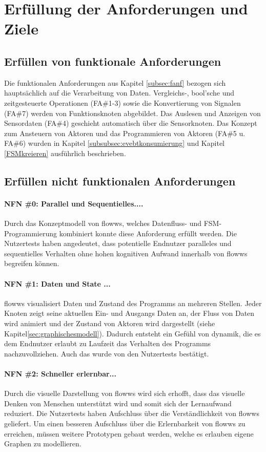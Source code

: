 \section{Erfüllung der Anforderungen und Ziele}
\subsection{Erfüllen von funktionale Anforderungen}
Die funktionalen Anforderungen aus Kapitel \ref{subsec:fanf} bezogen sich hauptsächlich auf die Verarbeitung von Daten. Vergleichs-, bool'sche und zeitgesteuerte Operationen (FA\#1-3) sowie die Konvertierung von Signalen (FA\#7) werden von Funktionsknoten abgebildet. Das Auslesen und Anzeigen von Sensordaten (FA\#4) geschieht automatisch über die Sensorknoten. Das Konzept zum Ansteuern von Aktoren und das Programmieren von Aktoren (FA\#5 u. FA\#6) wurden in Kapitel \ref{subsubsec:evebtkonsumierung} und Kapitel \ref{FSMkreieren} ausführlich beschrieben.

\subsection{Erfüllen nicht funktionalen Anforderungen}
\paragraph{NFN \#0: Parallel und Sequentielles....} Durch das Konzeptmodell von flowws, welches Datenfluss- und \ac{FSM}-Programmierung kombiniert konnte diese Anforderung erfüllt werden. Die Nutzertests haben angedeutet, dass potentielle Endnutzer paralleles und sequentielles Verhalten ohne hohen kognitiven Aufwand innerhalb von flowws begreifen können.

\paragraph{NFN \#1: Daten und State ...} flowws visualisiert Daten und Zustand des Programms an mehreren Stellen. Jeder Knoten zeigt seine aktuellen Ein- und Ausgangs Daten an, der Fluss von Daten wird animiert und der Zustand von Aktoren wird dargestellt (siehe Kapitel\ref{sec:graphischesmodell}). Dadurch entsteht ein Gefühl von dynamik, die es dem Endnutzer erlaubt zu Laufzeit das Verhalten des Programms nachzuvollziehen. Auch das wurde von den Nutzertests bestätigt.

\paragraph{NFN \#2: Schneller erlernbar...} Durch die visuelle Darstellung von flowws wird sich erhofft, dass das visuelle Denken von Menschen unterstützt wird und somit sich der Lernaufwand reduziert. Die Nutzertests haben Aufschluss über die Verständlichkeit von flowws geliefert. Um einen besseren Aufschluss über die Erlernbarkeit von flowws zu erreichen, müssen weitere Prototypen gebaut werden, welche es erlauben eigene Graphen zu modellieren.

